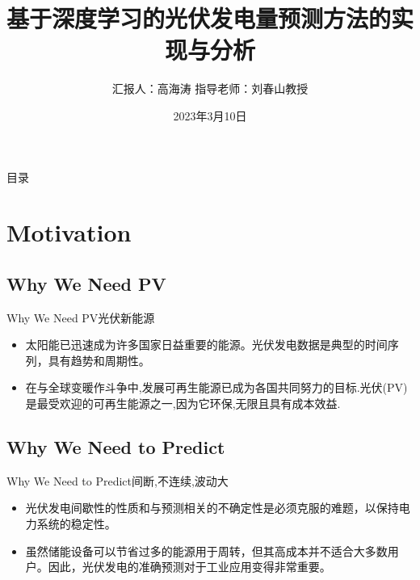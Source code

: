 \documentclass{ctexbeamer}
\title[光伏发电预测]{基于深度学习的光伏发电量预测方法的实现与分析}
\author{汇报人：高海涛 \newline  指导老师：刘春山教授}
\institute{杭州电子科技大学}
\date{2023年3月10日}
\begin{document}
\begin{frame}
  \titlepage
\end{frame}


\begin{frame}{目录}

    \tableofcontents     %
  
\end{frame}

\AtBeginSection[]{
	\begin{frame}
		\tableofcontents[currentsection]
	\end{frame}
} %



\graphicspath{{figures/}}

\section{Motivation}
\subsection{Why We Need PV}

    \begin{frame}{Why We Need PV}{光伏新能源}
        \begin{itemize}
        \item
        太阳能已迅速成为许多国家日益重要的能源。光伏发电数据是典型的时间序列，具有趋势和周期性。
        \item
        在与全球变暖作斗争中,发展可再生能源已成为各国共同努力的目标.光伏(PV)是最受欢迎的可再生能源之一,因为它环保,无限且具有成本效益.
        \end{itemize}
    \end{frame}



\subsection{Why We Need to Predict}
    \begin{frame}{Why We Need to Predict}{间断,不连续,波动大}
        \begin{itemize}
        \item
        光伏发电间歇性的性质和与预测相关的不确定性是必须克服的难题，以保持电力系统的稳定性。
        \item
        虽然储能设备可以节省过多的能源用于周转，但其高成本并不适合大多数用户。因此，光伏发电的准确预测对于工业应用变得非常重要。
        \end{itemize}
    \end{frame}
\end{document}
